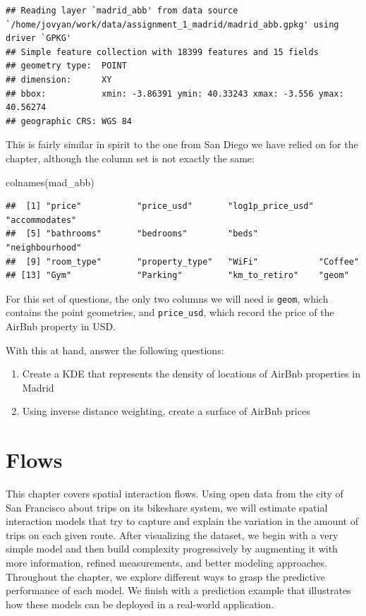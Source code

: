 \documentclass[
]{book}
\newenvironment{Shaded}{\begin{snugshade}}{\end{snugshade}}
\newcommand{\FunctionTok}[1]{\textcolor[rgb]{0.00,0.00,0.00}{#1}}
\newcommand{\NormalTok}[1]{#1}
\providecommand{\tightlist}{%
  \setlength{\itemsep}{0pt}\setlength{\parskip}{0pt}}
\begin{document}
\begin{verbatim}
## Reading layer `madrid_abb' from data source `/home/jovyan/work/data/assignment_1_madrid/madrid_abb.gpkg' using driver `GPKG'
## Simple feature collection with 18399 features and 15 fields
## geometry type:  POINT
## dimension:      XY
## bbox:           xmin: -3.86391 ymin: 40.33243 xmax: -3.556 ymax: 40.56274
## geographic CRS: WGS 84
\end{verbatim}

This is fairly similar in spirit to the one from San Diego we have relied on for the chapter, although the column set is not exactly the same:

\begin{Shaded}
\begin{Highlighting}[]
\FunctionTok{colnames}\NormalTok{(mad\_abb)}
\end{Highlighting}
\end{Shaded}

\begin{verbatim}
##  [1] "price"           "price_usd"       "log1p_price_usd" "accommodates"   
##  [5] "bathrooms"       "bedrooms"        "beds"            "neighbourhood"  
##  [9] "room_type"       "property_type"   "WiFi"            "Coffee"         
## [13] "Gym"             "Parking"         "km_to_retiro"    "geom"
\end{verbatim}

For this set of questions, the only two columns we will need is \texttt{geom}, which contains the point geometries, and \texttt{price\_usd}, which record the price of the AirBnb property in USD.

With this at hand, answer the following questions:

\begin{enumerate}
\def\labelenumi{\arabic{enumi}.}
\tightlist
\item
  Create a KDE that represents the density of locations of AirBnb properties in Madrid
\item
  Using inverse distance weighting, create a surface of AirBnb prices
\end{enumerate}

\hypertarget{flows}{%
\chapter{Flows}\label{flows}}

This chapter covers spatial interaction flows. Using open data from the city of San Francisco about trips on its bikeshare system, we will estimate spatial interaction models that try to capture and explain the variation in the amount of trips on each given route. After visualizing the dataset, we begin with a very simple model and then build complexity progressively by augmenting it with more information, refined measurements, and better modeling approaches. Throughout the chapter, we explore different ways to grasp the predictive performance of each model. We finish with a prediction example that illustrates how these models can be deployed in a real-world application.
\end{document}
